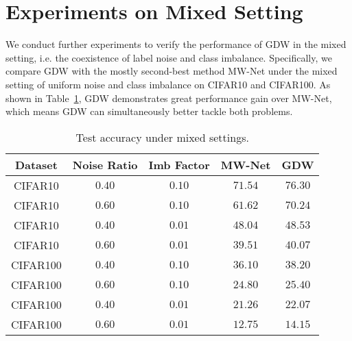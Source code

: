 \section{Experiments on Mixed Setting}
\label{section: Appendix_F}
We conduct further experiments to verify the performance of GDW in the mixed setting, i.e. the coexistence of label noise and class imbalance.
%
Specifically, we compare GDW with the mostly second-best method MW-Net \cite{shuMetaWeightNetLearningExplicit2019a} under the mixed setting of uniform noise and class imbalance on CIFAR10 and CIFAR100. 
%
As shown in Table~\ref{tab:mix}, GDW demonstrates great performance gain over MW-Net, which means GDW can simultaneously better tackle both problems. 

\begin{table}[htbp]
    \centering
    \caption{Test accuracy under mixed settings.}
    \label{tab:mix}
    \begin{tabular}{@{}ccccc@{}}
    \toprule
    Dataset & Noise Ratio & Imb Factor & MW-Net & GDW \\
    \midrule
    CIFAR10 & \(0.40\) & \(0.10\) & \(71.54\) & \(76.30\) \\
    CIFAR10 &\(0.60\) &\(0.10\) & \(61.62\) & \(70.24\) \\
    CIFAR10 & \(0.40\) & \(0.01\) & \(48.04\) & \(48.53\) \\
    CIFAR10 & \(0.60\) & \(0.01\) & \(39.51\) & \(40.07\) \\
    CIFAR100 &\(0.40\) &\(0.10\) & \(36.10\) & \(38.20\) \\
    CIFAR100 &\(0.60\) &\(0.10\) & \(24.80\) & \(25.40\) \\
    CIFAR100 &\(0.40\)& \(0.01\) & \(21.26\) & \(22.07\) \\
    CIFAR100 &\(0.60\) &\(0.01\) & \(12.75\) & \(14.15\) \\
    \bottomrule
    \end{tabular}
\end{table}